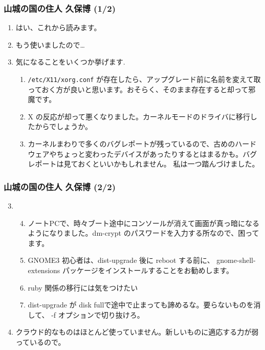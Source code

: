 \documentclass[cjk,dvipdfmx,10pt,compress,%
hyperref={bookmarks=true,bookmarksnumbered=true,bookmarksopen=false,%
colorlinks=false,%
pdftitle={第 71 回 関西 Debian 勉強会},%
pdfauthor={倉敷・のがた・佐々木・かわだ・八津尾},%
pdfsubject={資料},%
}]{beamer}
\begin{document}
\begin{frame}
\frametitle{ 山城の国の住人 久保博 (1/2)}
  \begin{enumerate}
  \item %
    はい、これから読みます。
  \item %
    もう使いましたので…
  \item %
    気になることをいくつか挙げます.
    \def\theenumii{\alph{enumii}}
    \def\labelenumii{\theenumii.~}
    \begin{enumerate}
    \item %
      \texttt{/etc/X11/xorg.conf} が存在したら、アップグレード前に名前を変えて取っておく方が良いと思います。おそらく、そのまま存在すると却って邪魔です。
    \item %
      X の反応が却って悪くなりました。カーネルモードのドライバに移行したからでしょうか。
    \item %
      カーネルまわりで多くのバグレポートが残っているので、古めのハードウェアやちょっと変わったデバイスがあったりするとはまるかも。バグレポートは見ておくといいかもしれません。 私は一つ踏んづけました。
    \end{enumerate}
  \end{enumerate}
\end{frame}

\begin{frame}
\frametitle{ 山城の国の住人 久保博 (2/2)}
  \begin{enumerate}
    \setcounter{enumi}{2}
  \item %
    \def\theenumii{\alph{enumii}}
    \def\labelenumii{\theenumii.~}
    \begin{enumerate}
      \setcounter{enumii}{3}
    \item %
      ノートPCで、時々ブート途中にコンソールが消えて画面が真っ暗になるようになりました。dm-crypt のパスワードを入力する所なので、困ってます。
    \item %
      GNOME3 初心者は、dist-upgrade 後に reboot する前に、 gnome-shell-extensions パッケージをインストールすることをお勧めします。
    \item %
      ruby 関係の移行には気をつけたい
    \item %
      dist-upgrade が disk fullで途中で止まっても諦めるな。要らないものを消して、 -f オプションで切り抜けろ。
    \end{enumerate}
  \item %
    クラウド的なものはほとんど使っていません。新しいものに適応する力が弱っているので。
  \end{enumerate}
\end{frame}
\end{document}
